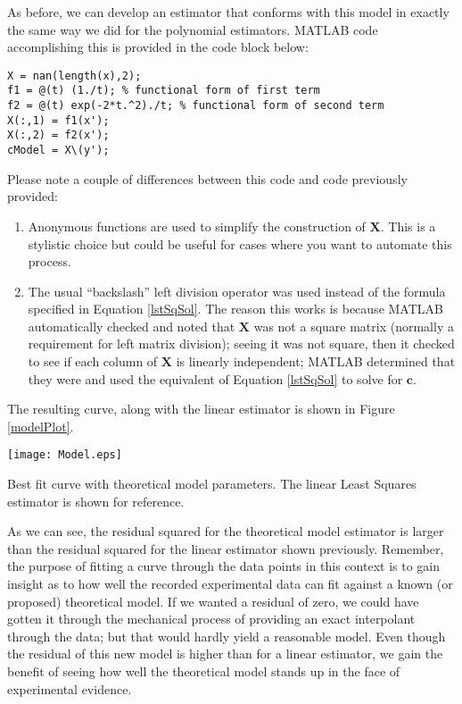 As before, we can develop an estimator that conforms with this model in exactly the same way we did for the polynomial estimators.  MATLAB code accomplishing this is provided in the code block below:

\begin{lstlisting}[style=myMatlab]
X = nan(length(x),2);
f1 = @(t) (1./t); % functional form of first term
f2 = @(t) exp(-2*t.^2)./t; % functional form of second term
X(:,1) = f1(x');
X(:,2) = f2(x');
cModel = X\(y');
\end{lstlisting}

Please note a couple of differences between this code and code previously provided:

\begin{enumerate}%
\item Anonymous functions are used to simplify the construction of
  $\mathbf{X}$.  This is a stylistic choice but could be useful for
  cases where you want to automate this process.
\item The usual ``backslash'' left division operator was used instead of the formula specified in Equation \ref{lstSqSol}.  The reason this works is because
  MATLAB automatically checked and noted that $\mathbf{X}$ was not a square
  matrix (normally a requirement for left matrix division); seeing it was
  not square, then it checked to see if each column of $\mathbf{X}$ is
  linearly independent; MATLAB determined that they were and used the equivalent of
  Equation \ref{lstSqSol} to solve for $\mathbf{c}$.  
\end{enumerate}

The resulting curve, along with the linear estimator is shown in Figure \ref{modelPlot}.


\begin{marginfigure}[-2.0cm]
\texttt{[image: Model.eps]}
\caption{Best fit curve with theoretical model parameters.  The linear Least
  Squares estimator is shown for reference.}
\label{modelPlot}
\end{marginfigure}  


As we can see, the residual squared for the theoretical model estimator is larger than the residual squared for the linear estimator shown previously. Remember, the purpose of fitting a curve through the data points in this context is to gain insight as to how well the recorded experimental data can fit against a known (or proposed) theoretical model.  If we wanted a residual of zero, we could have gotten it through the mechanical process of providing an exact interpolant through the data; but that would hardly yield a reasonable model.  Even though the residual of this new model is higher than for a linear estimator, we gain the benefit of seeing how well the theoretical model stands up in the face of experimental evidence.  

